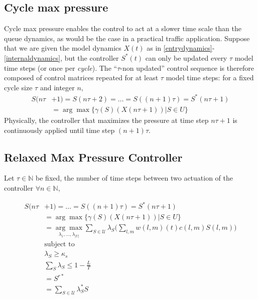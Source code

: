 \subsection*{Cycle max pressure}

Cycle max pressure enables the control to act at a slower time scale than the queue dynamics, as would be the case in a practical traffic application. Suppose that we are given the model dynamics $X(t)$ as in \eqref{entrydynamics}-\eqref{internaldynamics}, but the controller $S^*(t)$ can only be updated every $\tau$ model time steps (or once per \emph{cycle}). The ``$\tau$-non updated'' control sequence is therefore composed of control matrices repeated for at least $\tau$ model time steps: for a fixed cycle size $\tau$ and integer $n$, 
\begin{align} \nonumber
S(n\tau&+1)  = S(n\tau +2) = \ldots = S((n+1)\tau ) = S^*(n\tau +1) \\
&=  \arg\max\{\gamma(S)(X(n\tau +1 )) \vert S \in U\}  
 \label{CYCLE_CONTROLLER}
\end{align}
Physically, the controller that maximizes the pressure at time step $n\tau + 1$ is continuously applied until time step $(n + 1)\tau$.

\subsection*{Relaxed Max Pressure Controller}

Let $\tau \in \mathbb{N}$ be fixed, the number of time steps between two actuation of the controller
$\forall n \in \mathbb{N}$, 

\begin{align} \nonumber
S(n\tau&+1)   = \ldots = S((n+1)\tau ) = S^*(n\tau +1) \\
&=  \arg\max\{\gamma(S)(X(n\tau +1 )) \vert S \in U\}  \\
& =  \underset{\lambda_{1},...,\lambda_{\vert U\vert}}{ \arg \max}  \sum_{S \in \mathcal{U}}\lambda_{S}\Big(\sum_{l,m} w(l,m)(t)c(l,m) S(l,m)\Big)  \\
\nonumber  & \text{subject to}\\
\nonumber  &  \lambda_{S} \geq \kappa_s\\
& \sum_{S} \lambda_{S} \leq 1 - \tfrac{L}{T}  \label{distMP_LP}\\
& = S^{r*} \\
&= \displaystyle\sum_{S \in \mathcal{U}}\lambda_{S}^{*}S
\end{align}


